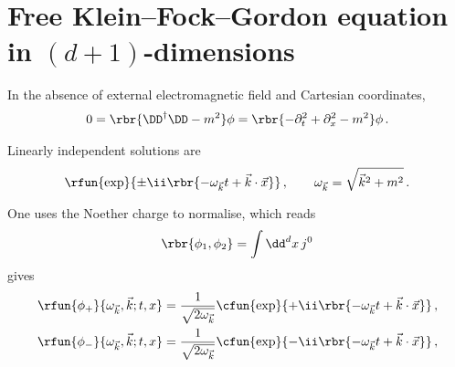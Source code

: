 \documentclass[a4paper]{article}
\numberwithin{equation}{subsection}
\begin{document}
\section{Free Klein--Fock--Gordon equation in $(d+1)$-dimensions}

In the absence of external electromagnetic field and Cartesian coordinates,
\begin{align}
0 = \rbr{\DD^{\dagger} \DD - m^2}\phi =
	\rbr{-\partial_t^2+\partial_x^2 - m^2}\phi\,.
\end{align}

Linearly independent solutions are
\begin{align}
\rfun{\exp}{\pm\ii\rbr{-\omega_{\vec{k}} t + \vec{k}\cdot\vec{x}}}\,,
\qquad
\omega_{\vec{k}} = \sqrt{\vec{k}^2 + m^2}\,.
\end{align}

One uses the Noether charge to normalise, which reads
\begin{align}
\rbr{\phi_1, \phi_2} = \int \dd^d x\, j^{0}
\end{align}
gives
\begin{align}
\begin{split}
\rfun{\phi_{+}}{\omega_{\vec{k}},\vec{k}; t, x} &= 
\frac{1}{\sqrt{2\omega_{\vec{k}}}}
\cfun{\exp}{+\ii\rbr{-\omega_{\vec{k}} t + \vec{k}\cdot\vec{x}}}\,,
\\
\rfun{\phi_{-}}{\omega_{\vec{k}},\vec{k}; t, x} &=
\frac{1}{\sqrt{2\omega_{\vec{k}}}}
\cfun{\exp}{-\ii\rbr{-\omega_{\vec{k}} t + \vec{k}\cdot\vec{x}}}\,,
\end{split}
\end{align}
\end{document}
